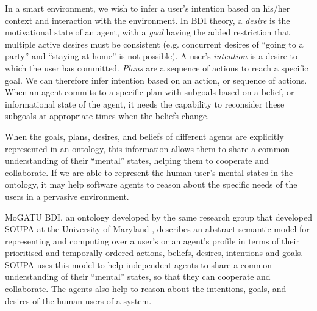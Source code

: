 In a smart environment, we wish to infer a user's intention based on his/her context and interaction with the environment. In \ac{BDI} theory, a \emph{desire} is the motivational state of an agent, with a \emph{goal} having the added restriction that multiple active desires must be consistent (e.g. concurrent desires of ``going to a party'' and ``staying at home'' is not possible). A user's \emph{intention} is a desire to which the user has committed. \emph{Plans} are a sequence of actions to reach a specific goal. We can therefore infer intention based on an action, or sequence of actions. When an agent commits to a specific plan with subgoals based on a \ac{belief}, or informational state of the agent, it needs the capability to reconsider these subgoals at appropriate times when the beliefs change.









When the goals, plans, desires, and beliefs of different agents are explicitly represented in an ontology, this information allows them to share a common understanding of their ``mental'' states, helping them to cooperate and collaborate. If we are able to represent the human user's mental states in the ontology, it may help software agents to reason about the specific needs of the users in a pervasive environment. 

MoGATU \ac{BDI}, an ontology developed by the same research group that developed \ac{SOUPA} at the University of Maryland \cite{Yesha2004}, describes an abstract semantic model for representing and computing over a user's or an agent's profile in terms of their prioritised and temporally ordered actions, beliefs, desires, intentions and goals. \ac{SOUPA} uses this model to help independent agents to share a common understanding of their ``mental'' states, so that they can cooperate and collaborate. The agents also help to reason about the intentions, goals, and desires of the human users of a system. 



